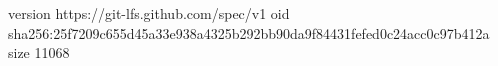 version https://git-lfs.github.com/spec/v1
oid sha256:25f7209c655d45a33e938a4325b292bb90da9f84431fefed0c24acc0c97b412a
size 11068
